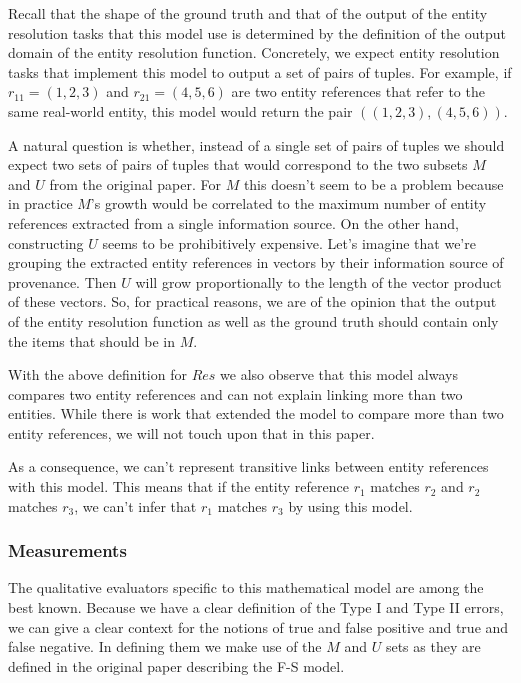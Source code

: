 \documentclass[11pt]{article}
\begin{document}
    Recall that the shape of the ground truth and that of the output of the
    entity resolution tasks that this model use is determined by the definition
    of the output domain of the entity resolution function.
    Concretely, we expect entity resolution tasks that implement this model to
    output a set of pairs of tuples.
    For example, if $r_{11}=(1, 2, 3)$ and $r_{21}=(4, 5, 6)$ are two entity
    references that refer to the same real-world entity, this model would return
    the pair $((1, 2, 3), (4, 5, 6))$.

    A natural question is whether, instead of a single set of pairs of tuples we
    should expect two sets of pairs of tuples that would correspond to the two
    subsets $M$ and $U$ from the original paper.
    For $M$ this doesn't seem to be a problem because in practice $M$'s growth
    would be correlated to the maximum number of entity references extracted
    from a single information source.
    On the other hand, constructing $U$ seems to be prohibitively expensive.
    Let's imagine that we're grouping the extracted entity references in vectors
    by their information source of provenance.
    Then $U$ will grow proportionally to the length of the vector product of
    these vectors.
    So, for practical reasons, we are of the opinion that the output of the
    entity resolution function as well as the ground truth should contain only
    the items that should be in $M$.

    With the above definition for $Res$ we also observe that this model always
    compares two entity references and can not explain linking more than two
    entities\cite{Tal11}.
    While there is work that extended the model to compare more than two 
    entity references\cite{Kon19}, we will not touch upon that in this paper.
    
    As a consequence, we can't represent transitive links between entity
    references with this model.
    This means that if the entity reference $r_1$ matches $r_2$ and
    $r_2$ matches $r_3$, we can't infer that $r_1$ matches $r_3$ by using this
    model\cite{Tal11}.

    \subsubsection[fms-measure]{Measurements}\label{fsm-measure}

    The qualitative evaluators specific to this mathematical model are among
    the best known.
    Because we have a clear definition of the Type I and Type II errors, we can
    give a clear context for the notions of true and false positive and true and
    false negative.
    In defining them we make use of the $M$ and $U$ sets as they are defined in
    the original paper describing the F-S model.
\end{document}
